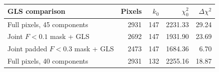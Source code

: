 \begin{tabular}{lrrrr}
\hline
GLS comparison & Pixels & $k_0$ & $\chi^2_0$ & $\Delta\chi^2$ \\
\hline
Full pixels, 45 components & 2931 & 147 & 2231.33 & 29.24 \\
Joint $F<0.1$ mask + GLS & 2692 & 147 & 1931.90 & 23.69 \\
Joint padded $F<0.3$ mask + GLS & 2473 & 147 & 1684.36 & 6.70 \\
Full pixels, 40 components & 2931 & 132 & 2255.16 & 18.87 \\
\hline
\end{tabular}
